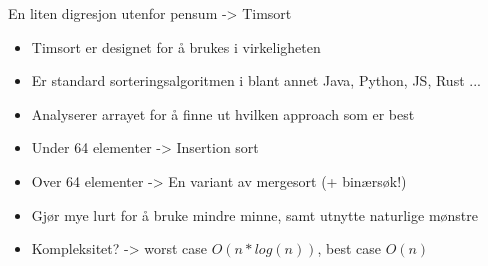 \documentclass[norsk, handout]{beamer}
\begin{document}
    \begin{frame}{En liten digresjon utenfor pensum -> Timsort}
        \begin{itemize}
            \item Timsort er designet for å brukes i virkeligheten
            \item Er standard sorteringsalgoritmen i blant annet Java, Python, JS, Rust ...
            \item Analyserer arrayet for å finne ut hvilken approach som er best
            \item Under 64 elementer -> Insertion sort
            \item Over 64 elementer -> En variant av mergesort (+ binærsøk!)
            \item Gjør mye lurt for å bruke mindre minne, samt utnytte naturlige mønstre
            \item Kompleksitet? \pause -> worst case $O(n*log(n))$, best case $O(n)$
        \end{itemize}
    \end{frame}
\end{document}
